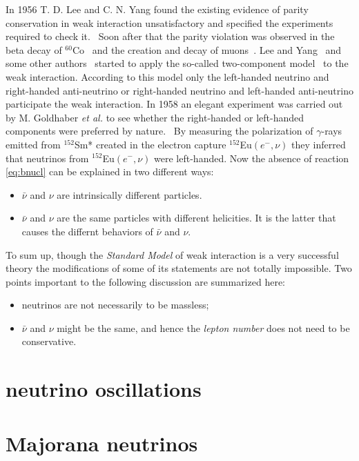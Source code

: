 In 1956 T. D. Lee and C. N. Yang found the existing evidence of parity
conservation in weak interaction unsatisfactory and specified the
experiments required to check it.~\cite{Lee56} Soon after that the
parity violation was observed in the beta decay of
$^{60}$Co~\cite{Wu57} and the creation and decay of
muons~\cite{Gar57,Fri57}. Lee and Yang~\cite{Lee57} and some other
authors~\cite{Sal57,Lan57} started to apply the so-called
two-component model~\cite{Wey29} to the weak interaction. According to
this model only the left-handed neutrino and right-handed
anti-neutrino or right-handed neutrino and left-handed anti-neutrino
participate the weak interaction. In 1958 an elegant experiment was
carried out by M. Goldhaber \textit{et al.} to see whether the
right-handed or left-handed components were preferred by
nature.~\cite{Gol58} By measuring the polarization of $\gamma$-rays
emitted from $^{152}$Sm* created in the electron capture
$^{152}$Eu$(e^-,\nu)$ they inferred that neutrinos from
$^{152}$Eu$(e^-,\nu)$ were left-handed. Now the absence of reaction
\ref{eq:bnucl} can be explained in two different ways:
\begin{itemize}
\item $\bar{\nu}$ and $\nu$ are intrinsically different particles.
\item $\bar{\nu}$ and $\nu$ are the same particles with different
  helicities. It is the latter that causes the differnt behaviors of
  $\bar{\nu}$ and $\nu$.
\end{itemize}

To sum up, though the \emph{Standard Model} of weak interaction is a
very successful theory the modifications of some of its statements are
not totally impossible. Two points important to the following
discussion are summarized here:
\begin{itemize}
\item neutrinos are not necessarily to be massless;
\item $\bar{\nu}$ and $\nu$ might be the same, and hence the
  \emph{lepton number} does not need to be conservative.
\end{itemize}


\section{neutrino oscillations}
\label{sec:osci}

\section{Majorana neutrinos}
\label{sec:major}

